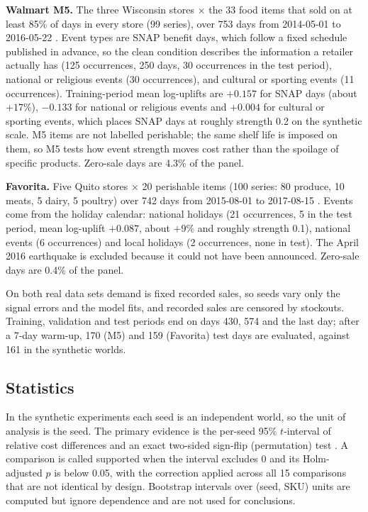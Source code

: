 \textbf{Walmart M5.} The three Wisconsin stores $\times$ the 33 food items that sold on at least 85\% of days in every store (99 series), over 753 days from 2014-05-01 to 2016-05-22 \cite{makridakis2022m5background}. Event types are SNAP benefit days, which follow a fixed schedule published in advance, so the clean condition describes the information a retailer actually has (125 occurrences, 250 days, 30 occurrences in the test period), national or religious events (30 occurrences), and cultural or sporting events (11 occurrences). Training-period mean log-uplifts are $+0.157$ for SNAP days (about $+17\%$), $-0.133$ for national or religious events and $+0.004$ for cultural or sporting events, which places SNAP days at roughly strength 0.2 on the synthetic scale. M5 items are not labelled perishable; the same shelf life is imposed on them, so M5 tests how event strength moves cost rather than the spoilage of specific products. Zero-sale days are 4.3\% of the panel.

\textbf{Favorita.} Five Quito stores $\times$ 20 perishable items (100 series: 80 produce, 10 meats, 5 dairy, 5 poultry) over 742 days from 2015-08-01 to 2017-08-15 \cite{favorita2018kaggle}. Events come from the holiday calendar: national holidays (21 occurrences, 5 in the test period, mean log-uplift $+0.087$, about $+9\%$ and roughly strength 0.1), national events (6 occurrences) and local holidays (2 occurrences, none in test). The April 2016 earthquake is excluded because it could not have been announced. Zero-sale days are 0.4\% of the panel.

On both real data sets demand is fixed recorded sales, so seeds vary only the signal errors and the model fits, and recorded sales are censored by stockouts. Training, validation and test periods end on days 430, 574 and the last day; after a 7-day warm-up, 170 (M5) and 159 (Favorita) test days are evaluated, against 161 in the synthetic worlds.

\subsection{Statistics}
In the synthetic experiments each seed is an independent world, so the unit of analysis is the seed. The primary evidence is the per-seed 95\% $t$-interval of relative cost differences and an exact two-sided sign-flip (permutation) test \cite{good2005permutation}. A comparison is called supported when the interval excludes 0 and its Holm-adjusted $p$ \cite{holm1979simple} is below 0.05, with the correction applied across all 15 comparisons that are not identical by design. Bootstrap intervals over (seed, SKU) units \cite{efron1993bootstrap} are computed but ignore dependence and are not used for conclusions.


